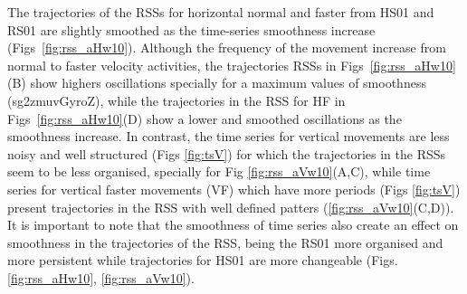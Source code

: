 The trajectories of the RSSs for horizontal normal and faster from 
HS01 and RS01 are slightly smoothed as the time-series 
smoothness increase (Figs~\ref{fig:rss_aHw10}). 
Although the frequency of the movement increase from normal to faster velocity
activities, the trajectories RSSs in Figs~\ref{fig:rss_aHw10}(B)
show highers oscillations specially for a maximum values of smoothness
(sg2zmuvGyroZ), while the trajectories in the RSS for HF in 
Figs~\ref{fig:rss_aHw10}(D) show a lower and smoothed oscillations 
as the smoothness increase.
In contrast, the time series for vertical movements are less noisy and 
well structured (Figs \ref{fig:tsV}) for which the trajectories in the RSSs 
seem to be less organised, specially for Fig \ref{fig:rss_aVw10}(A,C), 
while time series for vertical faster movements (VF) which have more 
periods (Figs \ref{fig:tsV}) present trajectories in the RSS with 
well defined patters (\ref{fig:rss_aVw10}(C,D)).
It is important to note that the smoothness of time series also create 
an effect on smoothness in the trajectories of the RSS, being the RS01 
more organised and more persistent while trajectories for HS01 are 
more changeable (Figs. \ref{fig:rss_aHw10}, \ref{fig:rss_aVw10}).


